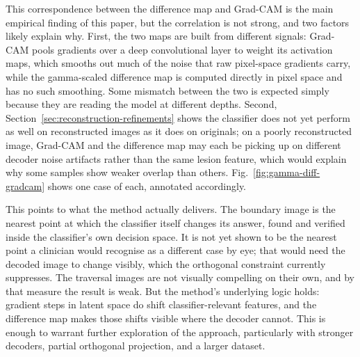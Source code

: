 \documentclass[conference,compsoc]{IEEEtran}
\begin{document}
This correspondence between the difference map and Grad-CAM is the main empirical finding of this paper, but the correlation is not strong, and two factors likely explain why. First, the two maps are built from different signals: Grad-CAM pools gradients over a deep convolutional layer to weight its activation maps, which smooths out much of the noise that raw pixel-space gradients carry, while the gamma-scaled difference map is computed directly in pixel space and has no such smoothing. Some mismatch between the two is expected simply because they are reading the model at different depths. Second, Section~\ref{sec:reconstruction-refinements} shows the classifier does not yet perform as well on reconstructed images as it does on originals; on a poorly reconstructed image, Grad-CAM and the difference map may each be picking up on different decoder noise artifacts rather than the same lesion feature, which would explain why some samples show weaker overlap than others. Fig.~\ref{fig:gamma-diff-gradcam} shows one case of each, annotated accordingly.

This points to what the method actually delivers. The boundary image is the nearest point at which the classifier itself changes its answer, found and verified inside the classifier's own decision space. It is not yet shown to be the nearest point a clinician would recognise as a different case by eye; that would need the decoded image to change visibly, which the orthogonal constraint currently suppresses. The traversal images are not visually compelling on their own, and by that measure the result is weak. But the method's underlying logic holds: gradient steps in latent space do shift classifier-relevant features, and the difference map makes those shifts visible where the decoder cannot. This is enough to warrant further exploration of the approach, particularly with stronger decoders, partial orthogonal projection, and a larger dataset.
\end{document}

